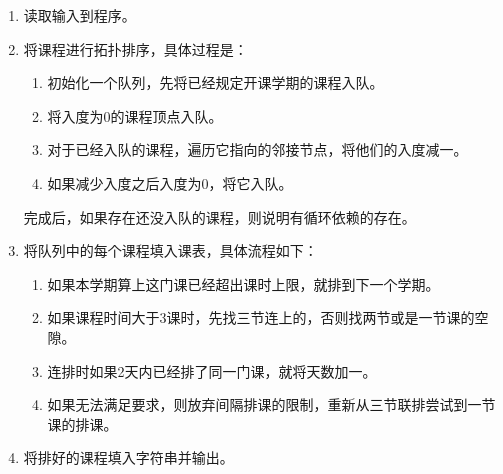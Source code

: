 \begin{enumerate}
    \item 读取输入到程序。
    \item 将课程进行拓扑排序，具体过程是：
    \begin{enumerate}
        \item 初始化一个队列，先将已经规定开课学期的课程入队。
        \item 将入度为0的课程顶点入队。
        \item 对于已经入队的课程，遍历它指向的邻接节点，将他们的入度减一。
        \item 如果减少入度之后入度为0，将它入队。
    \end{enumerate}
    完成后，如果存在还没入队的课程，则说明有循环依赖的存在。
    \item 将队列中的每个课程填入课表，具体流程如下：
    \begin{enumerate}
        \item 如果本学期算上这门课已经超出课时上限，就排到下一个学期。
        \item 如果课程时间大于3课时，先找三节连上的，否则找两节或是一节课的空隙。
        \item 连排时如果2天内已经排了同一门课，就将天数加一。
        \item 如果无法满足要求，则放弃间隔排课的限制，重新从三节联排尝试到一节课的排课。
    \end{enumerate}
    \item 将排好的课程填入字符串并输出。
\end{enumerate}